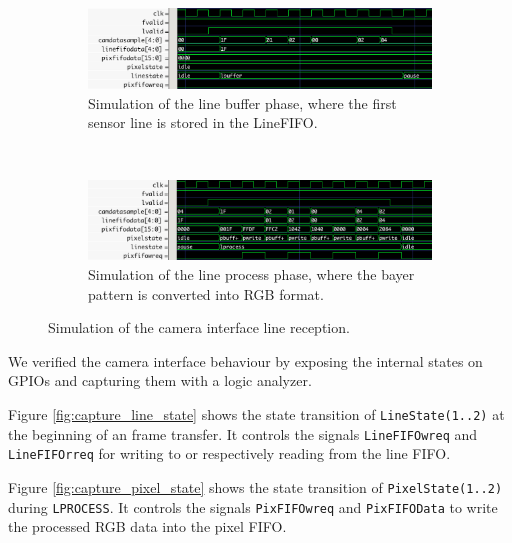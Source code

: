 \documentclass{article}
\begin{document}
\begin{figure}[H]
\centering
\begin{subfigure}[b]{\textwidth}
\centering
\includegraphics[width=\textwidth]{images/cam_interface_sim_lbuffer.png}
\caption{Simulation of the line buffer phase, where the first sensor line is stored in the LineFIFO.}
\label{fig:sim_lbuffer}
\end{subfigure}
~
\begin{subfigure}[b]{\textwidth}
\centering
\includegraphics[width=\textwidth]{images/cam_interface_sim_lprocess.png}
\caption{Simulation of the line process phase, where the bayer pattern is converted into RGB format.}
\label{fig:sim_lprocess}
\end{subfigure}
\caption{Simulation of the camera interface line reception.}
\label{fig:sim_line}
\end{figure}

We verified the camera interface behaviour by exposing the internal states on GPIOs and capturing them with a logic analyzer. 

Figure \ref{fig:capture_line_state} shows the state transition of \verb'LineState(1..2)' at the beginning of an frame transfer. It controls the signals \verb'LineFIFOwreq' and \verb'LineFIFOrreq' for writing to or respectively reading from the line FIFO.

Figure \ref{fig:capture_pixel_state} shows the state transition of \verb'PixelState(1..2)' during \verb'LPROCESS'. It controls the signals \verb'PixFIFOwreq' and \verb'PixFIFOData' to write the processed RGB data into the pixel FIFO.
\end{document}
